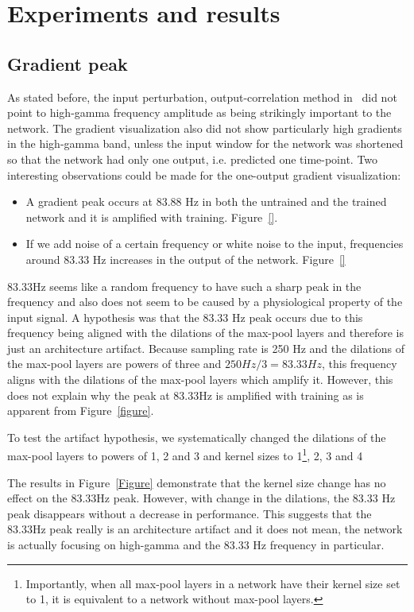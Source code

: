 \chapter{Experiments and results}
\label{ch:exp}

\section{Gradient peak}\label{sec:gradient-peak}
As stated before, the input perturbation, output-correlation method in~\cite{Hammer-2021} did not point to high-gamma frequency amplitude as being strikingly important to the network. The gradient visualization also did not show particularly high gradients in the high-gamma band, unless the input window for the network was shortened so that the network had only one output, i.e. predicted one time-point. Two interesting observations could be made for the one-output gradient visualization:
\begin{itemize}
\item[1.] A gradient peak occurs at 83.88 Hz in both the untrained and the trained network and it is amplified with training. Figure~\ref{}.
\item[2.] If we add noise of a certain frequency or white noise to the input, frequencies around 83.33 Hz increases in the output of the network. Figure~\ref{}
\end{itemize}

83.33Hz seems like a random frequency to have such a sharp peak in the frequency and also does not seem to be caused by a physiological property of the input signal.
A hypothesis was that the 83.33 Hz peak occurs due to this frequency being aligned with the dilations of the max-pool layers and therefore is just an architecture artifact.
Because sampling rate is 250 Hz and the dilations of the max-pool layers are powers of three and $250Hz/3 = 83.33Hz$, this frequency aligns with the dilations of the max-pool layers which amplify it.
However, this does not explain why the peak at 83.33Hz is amplified with training as is apparent from Figure~\ref{figure}.

To test the artifact hypothesis, we systematically changed the dilations of the max-pool layers to powers of 1, 2 and 3 and kernel sizes to 1\footnote{Importantly, when all max-pool layers in a network have their kernel size set to 1, it is equivalent to a network without max-pool layers.}, 2, 3 and 4

The results in Figure~\ref{Figure} demonstrate that the kernel size change has no effect on the 83.33Hz peak.
However, with change in the dilations, the 83.33 Hz peak disappears without a decrease in performance.
This suggests that the 83.33Hz peak really is an architecture artifact and it does not mean, the network is actually focusing on high-gamma and the 83.33 Hz frequency in particular.

